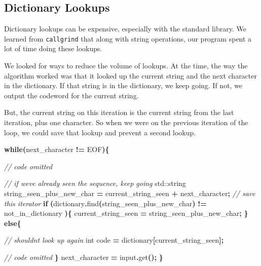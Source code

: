\documentclass[12pt,twoside]{reedthesis}
\newenvironment{Shaded}{\begin{snugshade}}{\end{snugshade}}
\newcommand{\BuiltInTok}[1]{#1}
\newcommand{\CommentTok}[1]{\textcolor[rgb]{0.56,0.35,0.01}{\textit{#1}}}
\newcommand{\ControlFlowTok}[1]{\textcolor[rgb]{0.13,0.29,0.53}{\textbf{#1}}}
\newcommand{\DataTypeTok}[1]{\textcolor[rgb]{0.13,0.29,0.53}{#1}}
\newcommand{\NormalTok}[1]{#1}
\newcommand{\OperatorTok}[1]{\textcolor[rgb]{0.81,0.36,0.00}{\textbf{#1}}}
\begin{document}
\hypertarget{dictionary-lookups}{%
\subsection{Dictionary Lookups}\label{dictionary-lookups}}

Dictionary lookups can be expensive, especially with the standard library. We learned from \texttt{callgrind} that along with string operations, our program spent a lot of time doing these lookups.

We looked for ways to reduce the volume of lookups. At the time, the way the algorithm worked was that it looked up the current string and the next character in the dictionary. If that string is in the dictionary, we keep going. If not, we output the codeword for the current string.

But, the current string on this iteration is the current string from the last iteration, plus one character. So when we were on the previous iteration of the loop, we could save that lookup and prevent a second lookup.
\begin{Shaded}
\begin{Highlighting}[]
\ControlFlowTok{while}\OperatorTok{(}\NormalTok{next\_character }\OperatorTok{!=}\NormalTok{ EOF}\OperatorTok{)\{}

    \CommentTok{// code omitted}


    \CommentTok{// if we\textquotesingle{}ve already seen the sequence, keep going}
    \BuiltInTok{std::}\NormalTok{string}\OperatorTok{ }\NormalTok{string\_seen\_plus\_new\_char }\OperatorTok{=}\NormalTok{ current\_string\_seen }\OperatorTok{+}\NormalTok{ next\_character}\OperatorTok{;}
    \CommentTok{// save this iterator\textasciigrave{}}
    \ControlFlowTok{if} \OperatorTok{(}\NormalTok{dictionary}\OperatorTok{.}\NormalTok{find}\OperatorTok{(}\NormalTok{string\_seen\_plus\_new\_char}\OperatorTok{)} \OperatorTok{!=}\NormalTok{ not\_in\_dictionary }\OperatorTok{)\{}
\NormalTok{        current\_string\_seen }\OperatorTok{=}\NormalTok{ string\_seen\_plus\_new\_char}\OperatorTok{;}
    \OperatorTok{\}}
    \ControlFlowTok{else}\OperatorTok{\{}

        \CommentTok{// shouldn\textquotesingle{}t look up again}
        \DataTypeTok{int}\NormalTok{ code }\OperatorTok{=}\NormalTok{ dictionary}\OperatorTok{[}\NormalTok{current\_string\_seen}\OperatorTok{];}


        \CommentTok{// code omitted}
    \OperatorTok{\}}
\NormalTok{    next\_character }\OperatorTok{=}\NormalTok{ input}\OperatorTok{.}\NormalTok{get}\OperatorTok{();}
\OperatorTok{\}}
\end{Highlighting}
\end{Shaded}
\end{document}
